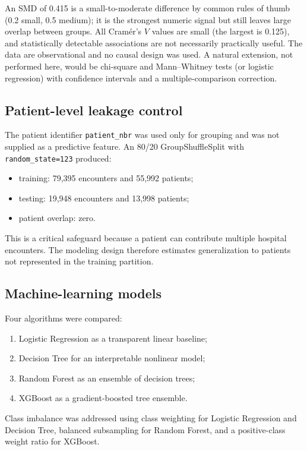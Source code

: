 \documentclass[10pt,a4paper]{article}
\begin{document}
An SMD of 0.415 is a small-to-moderate difference by common rules of thumb (0.2 small, 0.5 medium); it is the strongest numeric signal but still leaves large overlap between groups. All Cramér's $V$ values are small (the largest is 0.125), and statistically detectable associations are not necessarily practically useful. The data are observational and no causal design was used. A natural extension, not performed here, would be chi-square and Mann--Whitney tests (or logistic regression) with confidence intervals and a multiple-comparison correction.

\subsection{Patient-level leakage control}

The patient identifier \texttt{patient\_nbr} was used only for grouping and was not supplied as a predictive feature. An 80/20 GroupShuffleSplit with \texttt{random\_state=123} produced:
\begin{itemize}[leftmargin=1.2cm]
\item training: 79,395 encounters and 55,992 patients;
\item testing: 19,948 encounters and 13,998 patients;
\item patient overlap: zero.
\end{itemize}
This is a critical safeguard because a patient can contribute multiple hospital encounters. The modeling design therefore estimates generalization to patients not represented in the training partition.

\subsection{Machine-learning models}

Four algorithms were compared:
\begin{enumerate}[leftmargin=1.2cm]
\item Logistic Regression as a transparent linear baseline;
\item Decision Tree for an interpretable nonlinear model;
\item Random Forest as an ensemble of decision trees;
\item XGBoost as a gradient-boosted tree ensemble.
\end{enumerate}

Class imbalance was addressed using class weighting for Logistic Regression and Decision Tree, balanced subsampling for Random Forest, and a positive-class weight ratio for XGBoost.
\end{document}
